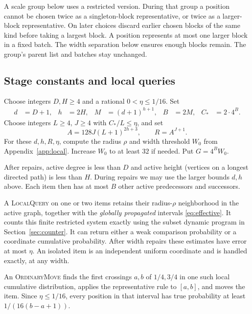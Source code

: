 A scale group below uses a restricted version. During that group a position
cannot be chosen twice as a singleton-block representative, or twice as a
larger-block representative. On later choices discard earlier chosen blocks
of the same kind before taking a largest block. A position represents at
most one larger block in a fixed batch. The width separation below ensures
enough blocks remain. The group's parent list and batches stay unchanged.

\subsection{Stage constants and local queries}
\label{sec:constants}

Choose integers $D,H\geq4$ and a rational $0<\eta\leq1/16$. Set
\begin{align}
d&=D+1,&h&=2H,& M&=(d+1)^{h+1},&
B&=2M,& C_*&=2\cdot4^B .
\label{eq:base-parameters}
\end{align}
Choose integers $L\geq4$, $J\geq4$ with $C_*/L\leq\eta$, and set
\begin{equation}
A=128J(L+1)^{2h+3},\qquad R=A^{J+1}.
\label{eq:scale-parameters}
\end{equation}
For these $d,h,R,\eta$, compute the radius $\rho$ and width threshold $W_0$
from Appendix~\ref{app:local}. Increase $W_0$ to at least $32$ if needed.
Put $G=4^B W_0$.

After repairs, active degree is less than $D$ and active height (vertices
on a longest directed path) is less than $H$. During repairs we may use
the larger bounds $d,h$ above. Each item then has at most $B$ other active
predecessors and successors.

A \textsc{LocalQuery} on one or two items retains their radius-$\rho$
neighborhood in the active graph, together with the \emph{globally
propagated} intervals \eqref{eq:effective}. It counts this finite restricted
system exactly using the subset dynamic program in
Section~\ref{sec:counter}. It can return either a weak comparison probability
or a coordinate cumulative probability. After width repairs these estimates
have error at most $\eta$. An isolated item is an independent uniform
coordinate and is handled exactly, at any width.

An \textsc{OrdinaryMove} finds the first crossings $a,b$ of $1/4,3/4$
in one such local cumulative distribution, applies the representative rule
to $[a,b]$, and moves the item. Since $\eta\leq1/16$, every position in
that interval has true probability at least $1/(16(b-a+1))$.

